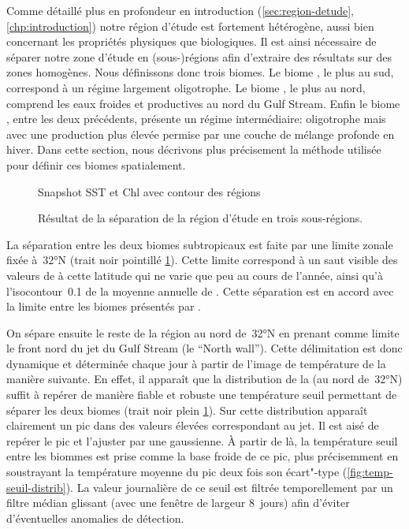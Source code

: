 Comme détaillé plus en profondeur en introduction (\cref{sec:region-detude}, \cref*{chp:introduction}) notre région d'étude est fortement hétérogène, aussi bien concernant les propriétés physiques que biologiques.
Il est ainsi nécessaire de séparer notre zone d'étude en (sous-)régions afin d'extraire des résultats sur des zones homogènes.
Nous définissons donc trois biomes.
Le biome , le plus au sud, correspond à un régime largement oligotrophe.
Le biome , le plus au nord, comprend les eaux froides et productives au nord du Gulf Stream.
Enfin le biome , entre les deux précédents, présente un régime intermédiaire: oligotrophe mais avec une production plus élevée permise par une couche de mélange profonde en hiver.
Dans cette section, nous décrivons plus précisement la méthode utilisée pour définir ces biomes spatialement.

\begin{figure}
  Snapshot SST et Chl avec contour des régions
  \caption[Séparation de la région d'étude en sous-régions]{
    Résultat de la séparation de la région d'étude en trois sous-régions.
  }
  \label{fig:separation-regions}
\end{figure}

La séparation entre les deux biomes subtropicaux est faite par une limite zonale fixée à~\ang{32}N (trait noir pointillé \cref{fig:separation-regions}).
Cette limite correspond à un saut visible des valeurs de  à cette latitude qui ne varie que peu au cours de l'année, ainsi qu'à l'isocontour~\qty{0.1}{\mgm} de la moyenne annuelle de .
Cette séparation est en accord avec la limite entre les biomes présentés par \textcite{sarmiento_2004}.

On sépare ensuite le reste de la région au nord de~\ang{32}N en prenant comme limite le front nord du jet du Gulf Stream (le \enquote{North wall}).
Cette délimitation est donc dynamique et déterminée chaque jour à partir de l'image de température de la manière suivante.
En effet, il apparaît que la distribution de la  (au nord de~\ang{32}N) suffit à repérer de manière fiable et robuste une température seuil permettant de séparer les deux biomes (trait noir plein \cref{fig:separation-regions}).
Sur cette distribution apparaît clairement un pic dans des valeurs élevées correspondant au jet.
Il est aisé de repérer le pic et l'ajuster par une gaussienne.
À partir de là, la température seuil entre les biommes est prise comme la base froide de ce pic,  plus précisemment en soustrayant la température moyenne du pic  deux fois son écart"-type (\cref{fig:temp-seuil-distrib}).
La valeur journalière de ce seuil est filtrée temporellement par un filtre médian glissant (avec une fenêtre de largeur 8~jours) afin d'éviter d'éventuelles anomalies de détection.

